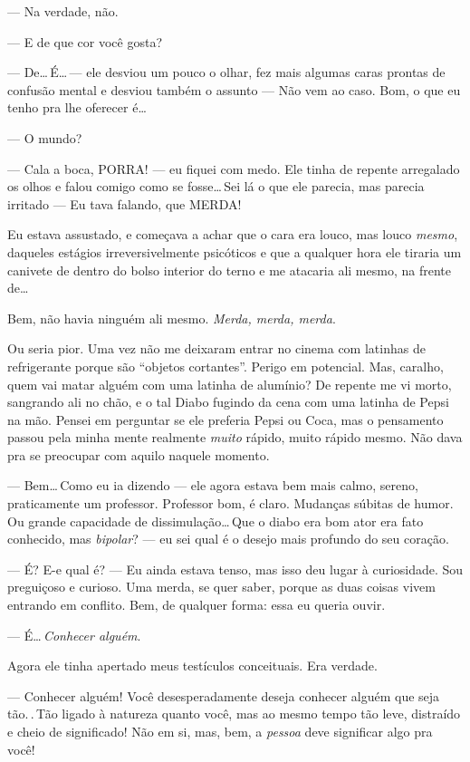 --- Na verdade, não.

--- E de que cor você gosta?

--- De\ldots\,É\ldots\,--- ele desviou um pouco o olhar, fez mais algumas caras prontas de confusão mental e desviou também o assunto --- Não vem ao caso. Bom, o que eu tenho pra lhe oferecer é\ldots

--- O mundo?

--- Cala a boca, PORRA! --- eu fiquei com medo. Ele tinha de repente arregalado os olhos e falou comigo como se fosse\ldots\,Sei lá o que ele parecia, mas parecia irritado --- Eu tava falando, que MERDA!

Eu estava assustado, e começava a achar que o cara era louco, mas louco \emph{mesmo}, daqueles estágios irreversivelmente psicóticos e que a qualquer hora ele tiraria um canivete de dentro do bolso interior do terno e me atacaria ali mesmo, na frente de\ldots

Bem, não havia ninguém ali mesmo. \emph{Merda, merda, merda}.

Ou seria pior. Uma vez não me deixaram entrar no cinema com latinhas de refrigerante porque são ``objetos cortantes''. Perigo em potencial. Mas, caralho, quem vai matar alguém com uma latinha de alumínio? De repente me vi morto, sangrando ali no chão, e o tal Diabo fugindo da cena com uma latinha de Pepsi na mão. Pensei em perguntar se ele preferia Pepsi ou Coca, mas o pensamento passou pela minha mente realmente \emph{muito} rápido, muito rápido mesmo. Não dava pra se preocupar com aquilo naquele momento.

--- Bem\ldots\,Como eu ia dizendo --- ele agora estava bem mais calmo, sereno, praticamente um professor. Professor bom, é claro. Mudanças súbitas de humor. Ou grande capacidade de dissimulação\ldots\,Que o diabo era bom ator era fato conhecido, mas \emph{bipolar}? --- eu sei qual é o desejo mais profundo do seu coração.

--- É? E-e qual é? --- Eu ainda estava tenso, mas isso deu lugar à curiosidade. Sou preguiçoso e curioso. Uma merda, se quer saber, porque as duas coisas vivem entrando em conflito. Bem, de qualquer forma: essa eu queria ouvir.

--- É\ldots\,\emph{Conhecer alguém}.

Agora ele tinha apertado meus testículos conceituais. Era verdade.

--- Conhecer alguém! Você desesperadamente deseja conhecer alguém que seja tão.\,.\,Tão ligado à natureza quanto você, mas ao mesmo tempo tão leve, distraído e cheio de significado! Não em si, mas, bem, a \emph{pessoa} deve significar algo pra você!

